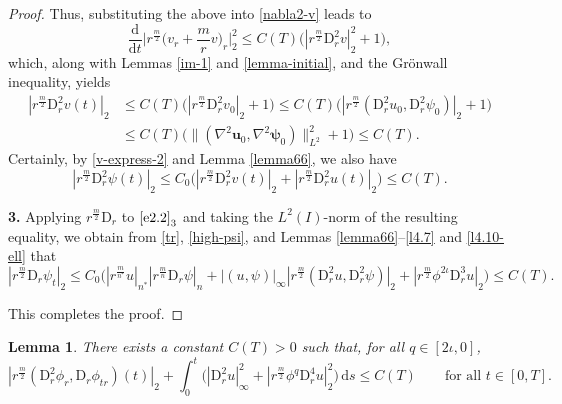 \documentclass[11pt,reqno]{amsart}
\newtheorem{lem}{Lemma}[section]
\numberwithin{rk}{section}
\numberwithin{prop}{section}
\numberwithin{mydef}{section}
\numberwithin{lem}{section}
\numberwithin{equation}{section}
\numberwithin{thm}{section}
\begin{document}
\begin{proof}
Thus, substituting the above into \eqref{nabla2-v} leads to
\begin{equation*}
\frac{\mathrm{d}}{\mathrm{d}t}\Big|r^\frac{m}{2}\big(v_r+\frac{m}{r}v\big)_r\Big|_2^2\leq C(T) \big(|r^\frac{m}{2}\mathrm{D}_r^2 v|_2^2+1\big),
\end{equation*}
which, along with Lemmas \ref{im-1} and \ref{lemma-initial}, and the Gr\"onwall inequality, yields
\begin{equation*}
\begin{aligned}
|r^\frac{m}{2}\mathrm{D}_r^2 v(t)|_2&\leq C(T)\big(|r^\frac{m}{2}\mathrm{D}_r^2 v_0|_2+1 \big)\leq C(T)\big(|r^\frac{m}{2}(\mathrm{D}_r^2u_0,\mathrm{D}_r^2\psi_0)|_2+1\big)\\
&\leq C(T)\big(\|(\nabla^2\boldsymbol{u}_0,\nabla^2\boldsymbol{\psi}_0)\|_{L^2}^2+1\big)\leq C(T).
\end{aligned}
\end{equation*}
Certainly, by \eqref{v-express-2} and Lemma \ref{lemma66}, we also have
\begin{equation}\label{high-psi}
|r^\frac{m}{2}\mathrm{D}_r^2 \psi(t)|_2\leq C_0\big(|r^\frac{m}{2}\mathrm{D}_r^2 v(t)|_2+|r^\frac{m}{2}\mathrm{D}_r^2 u(t)|_2\big)\leq C(T).
\end{equation}

\smallskip
\textbf{3.} Applying $r^\frac{m}{2}\mathrm{D}_r$ to $\eqref{e2.2}_3$ and taking the $L^2(I)$-norm of the resulting equality, we obtain from \eqref{tr}, \eqref{high-psi}, and Lemmas \ref{lemma66}--\ref{l4.7} and \ref{l4.10-ell} that
\begin{equation*}
|r^\frac{m}{2}\mathrm{D}_r \psi_t|_2\leq C_0\big(|r^\frac{m}{n^*}u|_{n^*}|r^\frac{m}{n}\mathrm{D}_r \psi|_n+|(u,\psi)|_\infty|r^\frac{m}{2}(\mathrm{D}_r^2u,\mathrm{D}_r^2 \psi)|_2 +|r^\frac{m}{2}\phi^{2\iota}\mathrm{D}_r^3u|_2 \big) \leq C(T).   
\end{equation*}

This completes the proof.
\end{proof}




\begin{lem}\label{Lemma6.12}
There exists a constant $C(T)>0$ such that, for all $q\in [2\iota,0]$,
\begin{equation*}
|r^\frac{m}{2}(\mathrm{D}_r^2 \phi_r,\mathrm{D}_r\phi_{tr})(t)|_2+\int_0^t\big(|\mathrm{D}_r^2 u|_\infty^2+|r^\frac{m}{2}\phi^q\mathrm{D}_r^4 u|_{2}^2\big) \,\mathrm{d}s\leq C(T)\qquad \text{for all $t\in [0,T]$}.
\end{equation*}
\end{lem}
\end{document}
